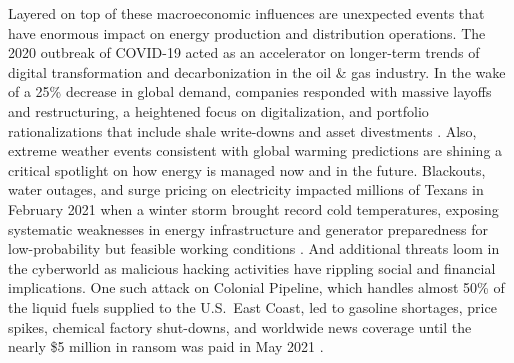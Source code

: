 Layered on top of these macroeconomic influences are unexpected events that have enormous impact on energy production and distribution operations. The 2020 outbreak of COVID-19 acted as an accelerator on longer-term trends of digital transformation and decarbonization in the oil \& gas industry. In the wake of a 25\% decrease in global demand, companies responded with massive layoffs and restructuring, a heightened focus on digitalization, and portfolio rationalizations that include shale write-downs and asset divestments \citep{deloitte_2021_2020}. Also, extreme weather events consistent with global warming predictions are shining a critical spotlight on how energy is managed now and in the future. Blackouts, water outages, and surge pricing on electricity impacted millions of Texans in February 2021 when a winter storm brought record cold temperatures, exposing systematic weaknesses in energy infrastructure and generator preparedness for low-probability but feasible working conditions \citep{harc_winter_2021,lazard_lazards_2020}. And additional threats loom in the cyberworld as malicious hacking activities have rippling social and financial implications. One such attack on Colonial Pipeline, which handles almost 50\% of the liquid fuels supplied to the U.S.\ East Coast, led to gasoline shortages, price spikes, chemical factory shut-downs, and worldwide news coverage until the nearly \$5 million in ransom was paid in May 2021 \citep{sanger_pipeline_2021}.

